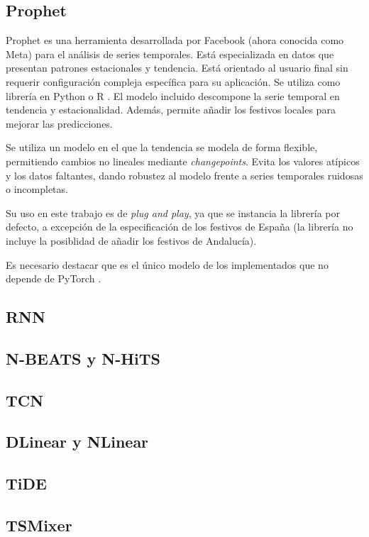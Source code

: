 \subsection{Prophet}

Prophet \cite{prophet} es una herramienta desarrollada por Facebook (ahora conocida como Meta) para el análisis de series temporales. Está especializada en datos que presentan patrones estacionales y tendencia. Está orientado al usuario final sin requerir configuración compleja específica para su aplicación. Se utiliza como librería en Python o R \cite{R}. El modelo incluido descompone la serie temporal en tendencia y estacionalidad. Además, permite añadir los festivos locales para mejorar las predicciones.

Se utiliza un modelo en el que la tendencia se modela de forma flexible, permitiendo cambios no lineales mediante \textit{changepoints}. Evita los valores atípicos y los datos faltantes, dando robustez al modelo frente a series temporales ruidosas o incompletas.

Su uso en este trabajo es de \textit{plug and play}, ya que se instancia la librería por defecto, a excepción de la especificación de los festivos de España (la librería no incluye la posiblidad de añadir los festivos de Andalucía).

Es necesario destacar que es el único modelo de los implementados que no depende de PyTorch \cite{pytorch}.

\subsection{RNN}
\subsection{N-BEATS y N-HiTS}
\subsection{TCN}
\subsection{DLinear y NLinear}
\subsection{TiDE}
\subsection{TSMixer}